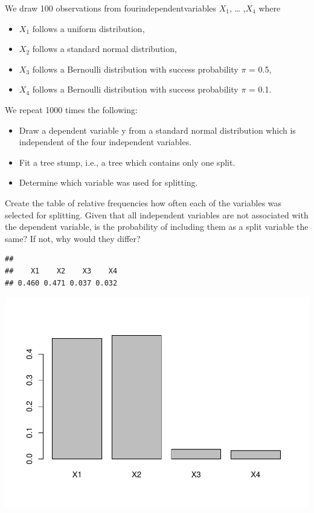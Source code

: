 \documentclass[
]{article}
\begin{document}
We draw 100 observations from fourindependentvariables \(X_1\), \ldots{}
,\(X_4\) where

\begin{itemize}
  \item $X_1$ follows a uniform distribution,
  \item $X_2$ follows a standard normal distribution,
  \item $X_3$ follows a Bernoulli distribution with success probability $\pi$ = 0.5,
  \item $X_4$ follows a Bernoulli distribution with success probability $\pi$ = 0.1.
\end{itemize}

We repeat 1000 times the following:

\begin{itemize}
  \item Draw a dependent variable y from a standard normal distribution which is independent of the four independent variables.
  \item Fit a tree stump, i.e., a tree which contains only one split.
  \item Determine which variable was used for splitting.
\end{itemize}

Create the table of relative frequencies how often each of the variables
was selected for splitting. Given that all independent variables are not
associated with the dependent variable, is the probability of including
them as a split variable the same? If not, why would they differ?

\begin{verbatim}
## 
##    X1    X2    X3    X4 
## 0.460 0.471 0.037 0.032
\end{verbatim}

\includegraphics{A3_files/figure-latex/unnamed-chunk-10-1.pdf}
\end{document}
